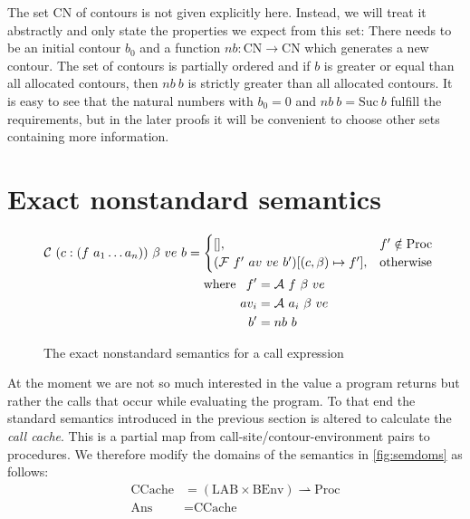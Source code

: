 \documentclass[a4paper,halfparskip,DIV=10,11pt]{scrbook}
\newcommand{\C}{\mathcal C}
\newcommand{\F}{\mathcal F}
\newcommand{\A}{\mathcal A}
\begin{document}
The set CN of contours is not given explicitly here. Instead, we will treat it abstractly and only state the properties we expect from this set: There needs to be an initial contour $b_0$ and a function $nb \colon \text{CN} \to \text{CN}$ which generates a new contour. The set of contours is partially ordered and if $b$ is greater or equal than all allocated contours, then $nb\ b$ is strictly greater than all allocated contours. It is easy to see that the natural numbers with $b_0 = 0$ and $nb\ b = \text{Suc}\ b$ fulfill the requirements, but in the later proofs it will be convenient to choose other sets containing more information. 

\section{Exact nonstandard semantics}

\begin{figure}
\begin{framed}
\begin{align*}
\C\ (c:(f\ a_1\ldots a_n))\ \beta\ ve\ b &= 
\begin{cases}
[], & f' \notin \text{Proc} \\
(\F\ f'\ av\ ve\ b' )[(c,\beta) \mapsto f'], &\text{otherwise}
\end{cases}\\
&\phantom{\strut=\strut}\text{where } 
\begin{aligned}[t]
f' &= \A\ f\ \beta\ ve \\
av_i &= \A\ a_i\ \beta\ ve\\
b' &= nb\ b
\end{aligned}
\end{align*}
\vspace{-1em}
\end{framed}
\caption{The exact nonstandard semantics for a call expression}
\label{fig:callsem}
\end{figure}

At the moment we are not so much interested in the value a program returns but rather the calls that occur while evaluating the program. To that end the standard semantics introduced in the previous section is altered to calculate the \textit{call cache}. This is a partial map from call-site/contour-environment pairs to procedures. We therefore modify the domains of the semantics in \vref{fig:semdoms} as follows:
\begin{align*}
\text{CCache} &= (\text{LAB}\times\text{BEnv}) \rightharpoonup \text{Proc}\\
\text{Ans} &= \text{CCache}
\end{align*}
\end{document}
